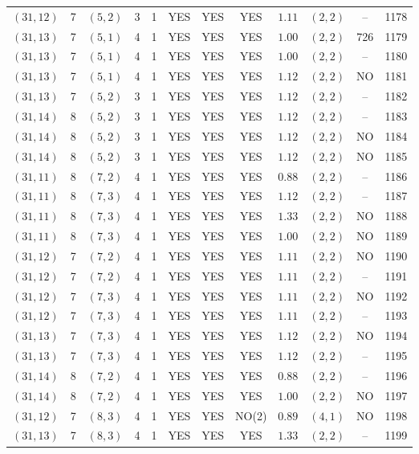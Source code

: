 \begin{longtable}{|c|c|c|c|c|c|c|c|c|c|c|c|}
$(31,12)$ & 7 & $(5,2)$ & 3 & 1 & YES & YES & YES & $1.11$ & $(2,2)$ & -- & 1178\\
$(31,13)$ & 7 & $(5,1)$ & 4 & 1 & YES & YES & YES & $1.00$ & $(2,2)$ & 726 & 1179\\
$(31,13)$ & 7 & $(5,1)$ & 4 & 1 & YES & YES & YES & $1.00$ & $(2,2)$ & -- & 1180\\
$(31,13)$ & 7 & $(5,1)$ & 4 & 1 & YES & YES & YES & $1.12$ & $(2,2)$ & NO & 1181\\
$(31,13)$ & 7 & $(5,2)$ & 3 & 1 & YES & YES & YES & $1.12$ & $(2,2)$ & -- & 1182\\
$(31,14)$ & 8 & $(5,2)$ & 3 & 1 & YES & YES & YES & $1.12$ & $(2,2)$ & -- & 1183\\
$(31,14)$ & 8 & $(5,2)$ & 3 & 1 & YES & YES & YES & $1.12$ & $(2,2)$ & NO & 1184\\
$(31,14)$ & 8 & $(5,2)$ & 3 & 1 & YES & YES & YES & $1.12$ & $(2,2)$ & NO & 1185\\
$(31,11)$ & 8 & $(7,2)$ & 4 & 1 & YES & YES & YES & $0.88$ & $(2,2)$ & -- & 1186\\
$(31,11)$ & 8 & $(7,3)$ & 4 & 1 & YES & YES & YES & $1.12$ & $(2,2)$ & -- & 1187\\
$(31,11)$ & 8 & $(7,3)$ & 4 & 1 & YES & YES & YES & $1.33$ & $(2,2)$ & NO & 1188\\
$(31,11)$ & 8 & $(7,3)$ & 4 & 1 & YES & YES & YES & $1.00$ & $(2,2)$ & NO & 1189\\
$(31,12)$ & 7 & $(7,2)$ & 4 & 1 & YES & YES & YES & $1.11$ & $(2,2)$ & NO & 1190\\
$(31,12)$ & 7 & $(7,2)$ & 4 & 1 & YES & YES & YES & $1.11$ & $(2,2)$ & -- & 1191\\
$(31,12)$ & 7 & $(7,3)$ & 4 & 1 & YES & YES & YES & $1.11$ & $(2,2)$ & NO & 1192\\
$(31,12)$ & 7 & $(7,3)$ & 4 & 1 & YES & YES & YES & $1.11$ & $(2,2)$ & -- & 1193\\
$(31,13)$ & 7 & $(7,3)$ & 4 & 1 & YES & YES & YES & $1.12$ & $(2,2)$ & NO & 1194\\
$(31,13)$ & 7 & $(7,3)$ & 4 & 1 & YES & YES & YES & $1.12$ & $(2,2)$ & -- & 1195\\
$(31,14)$ & 8 & $(7,2)$ & 4 & 1 & YES & YES & YES & $0.88$ & $(2,2)$ & -- & 1196\\
$(31,14)$ & 8 & $(7,2)$ & 4 & 1 & YES & YES & YES & $1.00$ & $(2,2)$ & NO & 1197\\
$(31,12)$ & 7 & $(8,3)$ & 4 & 1 & YES & YES & NO(2) & $0.89$ & $(4,1)$ & NO & 1198\\
$(31,13)$ & 7 & $(8,3)$ & 4 & 1 & YES & YES & YES & $1.33$ & $(2,2)$ & -- & 1199\\

\end{longtable}
